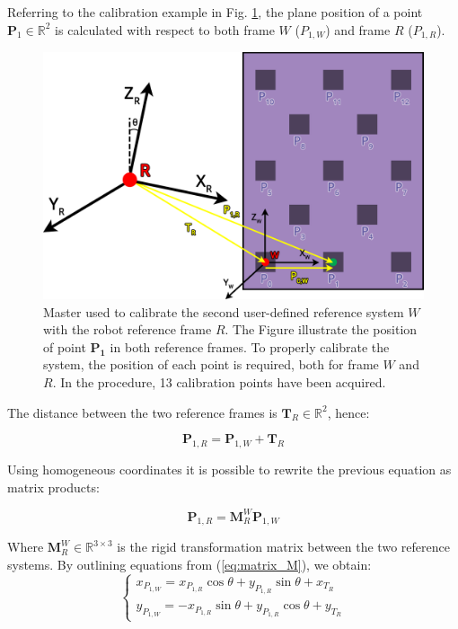 \documentclass[a4paper, 10 pt, conference]{ieeeconf}      %
\begin{document}
Referring to the calibration example in Fig. \ref{fig:master_robot}, the plane position of a point $\mathbf{P}_1\in\mathbb{R}^2$ is calculated with respect to both frame $W$ ($P_{1,W}$) and frame $R$ ($P_{1,R}$).

\begin{figure}[ht]
	\centering
	\includegraphics[width=1\columnwidth]{figures/calibration}
	\caption{Master used to calibrate the second user-defined reference system $W$ with the robot reference frame $R$. The Figure illustrate the position of  point $\mathbf{P_1}$ in both reference frames. To properly calibrate the system, the position of each point is required, both for frame $W$ and $R$. In the procedure, 13 calibration points have been acquired.}
	\label{fig:master_robot}
\end{figure}

The distance between the two reference frames is $\mathbf{T}_R\in\mathbb{R}^2$, hence:

\begin{equation}
\mathbf{P}_{1,R} = \mathbf{P}_{1,W} + \mathbf{T}_R
\end{equation}

Using homogeneous coordinates it is possible to rewrite the previous equation as matrix products:

\begin{equation}\label{eq:matrix_M}
\mathbf{P}_{1,R} = \mathbf{M}^W_{R}\mathbf{P}_{1,W}
\end{equation}

Where $\mathbf{M}^W_{R}\in\mathbb{R}^{3\times3}$ is the rigid transformation matrix between the two reference systems. By outlining equations from (\ref{eq:matrix_M}), we obtain:
\begin{equation}\label{eq:linear_sys1}
\begin{cases}
x_{P_{1,W}}=x_{P_{1,R}}\cos\theta+y_{P_{1,R}}\sin\theta+x_{T_R}\\
y_{P_{1,W}}=-x_{P_{1,R}}\sin\theta+y_{P_{1,R}}\cos\theta+y_{T_R}
\end{cases}
\end{equation}
\end{document}
